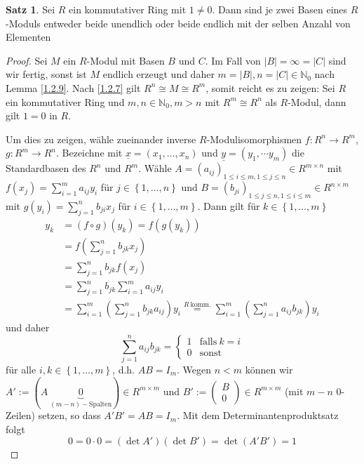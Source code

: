 \documentclass[
twoside=semi,
fontsize=12,
DIV=12, 
cleardoublepage=current,
leqno,
headings=optiontoheadandtoc, 
toc=idx
]{scrbook}
\newcommand{\N}{\mathbb{N}}
\newcommand{\brac}[1]{\left( #1 \right)}
\newcommand{\set}[1]{\left\{ #1 \right\}}
\theoremstyle{definition}
\newtheorem{satz}[definition]{Satz}
\begin{document}
	\begin{satz}\label{1.2.11}\hfill\newline
		Sei $R$ ein kommutativer Ring mit $1 \neq 0$. Dann sind je zwei Basen eines $R$-Moduls entweder beide unendlich oder beide endlich mit der selben Anzahl von Elementen
		
		\begin{proof}
			Sei $M$ ein $R$-Modul mit Basen $B$ und $C$. Im Fall von $|B| =  \infty = |C|$ sind wir fertig, sonst ist $M$ endlich erzeugt und daher $m = |B|, n = |C| \in \N_0$ nach Lemma \ref{1.2.9}. Nach \ref{1.2.7} gilt $R^n \cong M \cong R^m$, somit reicht es zu zeigen: Sei $R$ ein kommutativer Ring und $m, n \in \N_0, m > n$ mit $R^m \cong R^n$ als $R$-Modul, dann gilt $1 = 0$ in $R$. 
			
			\noindent Um dies zu zeigen, w\"ahle zueinander inverse $R$-Modulisomorphismen $f:R^n \to R^m$, \linebreak $g: R^m \to R^n$. Bezeichne mit $\underline{x} = (x_1, \dots, x_n)$ und $\underline{y} = (y_1, \dotsm y_m)$ die Standardbasen des $R^n$ und $R^m$. W\"ahle $A=(a_{ij})_{1\leq i \leq m, 1 \leq j \leq n}\in R^{m \times n}$ mit $\displaystyle f(x_j) = \sum_{i=1}^m a_{ij}y_i$ f\"ur $j \in \set{1, \dots, n}$ und $B = (b_{ji})_{1 \leq j \leq n, 1 \leq i \leq m} \in R^{n \times m}$ mit $\displaystyle g(y_i) = \sum_{j=1}^n b_{ji}x_j$ f\"ur $i \in \set{1, \dots, m}$. Dann gilt f\"ur $k \in \set{1, \dots, m}$
				\begin{align*}
					y_k &= (f \circ g)(y_k) = f(g(y_k))\\
					&= f\brac{\sum_{j=1}^n b_{jk}x_j}\\
					&= \sum_{j=1}^n b_{jk}f(x_j)\\
					&= \sum_{j=1}^n b_{jk}\sum_{i=1}^ma_{ij}y_i\\
					&= \sum_{i=1}^m\brac{\sum_{j=1}^n b_{jk}a_{ij} }y_i \overset{R\ \mathrm{komm.}}{=} \sum_{i=1}^m\brac{\sum_{j=1}^n a_{ij}b_{jk} }y_i
				\end{align*} 
			und daher
			\[\sum_{j=1}^n a_{ij}b_{jk} = \begin{cases}
				1 & \mathrm{falls }\ k = i\\
				0 & \mathrm{sonst}
			\end{cases}\] 
			f\"ur alle $i, k \in \set{1, \dots, m}$, d.h. $AB = I_m$.\newline
			Wegen $n < m$ k\"onnen wir $\displaystyle A' := (A\ \underbrace{0}_{(m-n)-\mathrm{Spalten}}) \in R^{m\times m}$ und $B' := \begin{pmatrix}
				B\\0
			\end{pmatrix} \in R^{m \times m}$ (mit $m-n$ $0$-Zeilen) setzen, so dass $A'B' = AB = I_m$. \newline
			Mit dem Determinantenproduktsatz folgt 
			\[0 = 0\cdot 0 = (\det A')(\det B') = \det(A'B') = 1\] 
		\end{proof}
	\end{satz}
\end{document}
